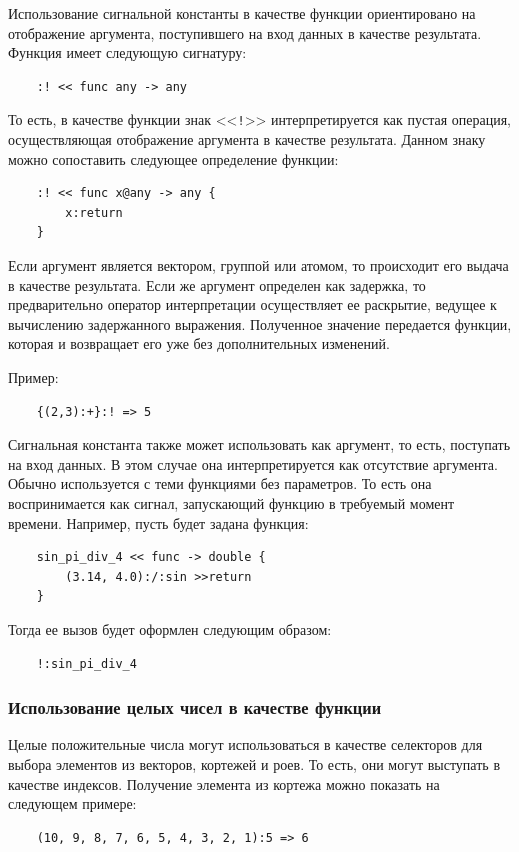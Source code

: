 Использование сигнальной константы в качестве функции ориентировано на отображение аргумента, поступившего на вход данных в качестве результата.
Функция имеет следующую сигнатуру:
\begin{verbatim}
    :! << func any -> any
\end{verbatim}

То есть, в качестве функции знак <<\verb|!|>> интерпретируется как пустая операция, осуществляющая отображение аргумента в качестве результата. Данном знаку можно сопоставить следующее определение функции:
\begin{verbatim}
    :! << func x@any -> any {
        x:return
    }
\end{verbatim}

Если аргумент является вектором, группой или атомом, то происходит его выдача в качестве результата.  Если же аргумент определен как задержка, то предварительно оператор интерпретации осуществляет ее раскрытие, ведущее к вычислению задержанного выражения. Полученное значение передается функции, которая и возвращает его уже без дополнительных изменений.

Пример:
\begin{verbatim}
    {(2,3):+}:! => 5
\end{verbatim}

Сигнальная константа также может использовать как аргумент, то есть, поступать на вход данных. В этом случае она интерпретируется как отсутствие аргумента.  Обычно используется с теми функциями без параметров. То есть она воспринимается как сигнал, запускающий функцию в требуемый момент времени. Например, пусть будет задана функция:
\begin{verbatim}
    sin_pi_div_4 << func -> double {
        (3.14, 4.0):/:sin >>return
    }
\end{verbatim}

Тогда ее вызов будет оформлен следующим образом:
\begin{verbatim}
    !:sin_pi_div_4
\end{verbatim}

\subsubsection{Использование целых чисел в качестве функции}

Целые положительные числа могут использоваться в качестве селекторов для выбора элементов из векторов, кортежей и роев. То есть, они могут выступать в качестве индексов. Получение элемента из кортежа можно показать на следующем примере:
\begin{verbatim}
    (10, 9, 8, 7, 6, 5, 4, 3, 2, 1):5 => 6
\end{verbatim}

